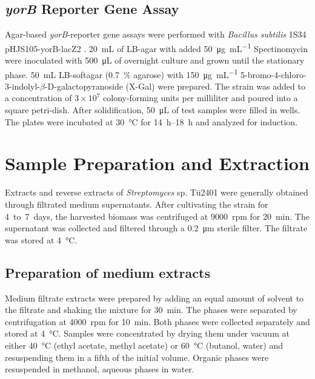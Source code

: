 
	\subsection{\emph{yorB} Reporter Gene Assay} %
	\label{sub:yorb_reporter_gene_assay}

	Agar-based \textit{yorB}-reporter gene assays were performed with \textit{Bacillus subtilis} 1S34 pHJS105-yorB-lacZ2 \autocite{Urban2007}. \SI{20}{\milli\liter} of LB-agar with added \SI{50}{\micro\gram\per\milli\liter} Spectinomycin were inoculated with \SI{500}{\micro\liter} of overnight culture and grown until the stationary phase. \SI{50}{\milli\liter} LB-softagar (0.7~\% agarose) with \SI{150}{\micro\gram\per\milli\liter} 5-bromo-4-chloro-3-indolyl-$\beta$-D-galactopyranoside (X-Gal) were prepared. The strain was added to a concentration of $3\times10^7$	colony-forming units per milliliter and poured into a square petri-dish. After solidification, \SI{50}{\micro\liter} of test samples were filled in wells. The plates were incubated at \SI{30}{\celsius} for \SIrange[range-units=single]{14}{18}{\hour} and analyzed for induction.



\clearpage

\section{Sample Preparation and Extraction} %
\label{sec:sample_preparation_and_extraction}

Extracts and reverse extracts of \emph{Streptomyces} sp. Tü2401 were generally obtained through filtrated medium supernatants. After  cultivating the strain for 4~to~7~days, the harvested biomass was centrifuged at 9000~rpm for \SI{20}{\minute}. The supernatant was collected and filtered through a \SI{0.2}{\micro\meter} sterile filter. The filtrate was stored at \SI{4}{\celsius}.

	\subsection{Preparation of medium extracts} %
	\label{sub:preparation_of_medium_extracts}

	Medium filtrate extracts were prepared by adding an equal amount of solvent to the filtrate and shaking the mixture for \SI{30}{\minute}. The phases were separated by centrifugation at 4000~rpm for \SI{10}{\minute}. Both phases were collected separately and stored at \SI{4}{\celsius}. Samples were concentrated by drying them under vacuum at either \SI{40}{\celsius} (ethyl acetate, methyl acetate) or \SI{60}{\celsius} (butanol, water) and resuspending them in a fifth of the initial volume. Organic phases were resuspended in methanol, aqueous phases in water.

